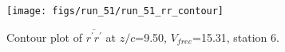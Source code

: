 \begin{figure}[H]
\centering
\texttt{[image: figs/run\_51/run\_51\_rr\_contour]}
\caption{Contour plot of $\overline{r^\prime r^\prime}$ at $z/c$=9.50, $V_{free}$=15.31, station 6.}
\label{fig:run_51_rr_contour}
\end{figure}


